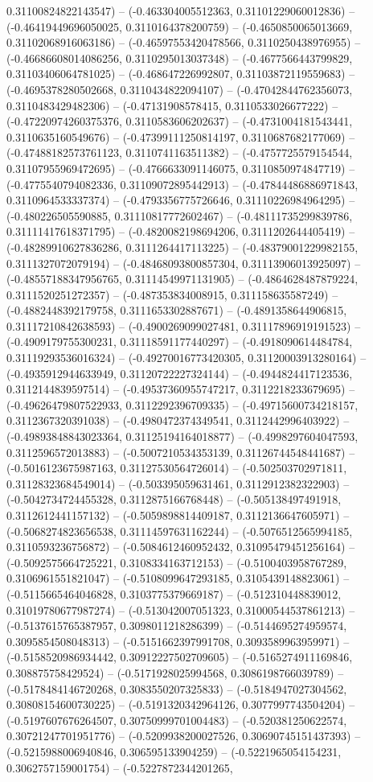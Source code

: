 0.31100824822143547) -- (-0.463304005512363, 0.31101229060012836) -- (-0.46419449696050025, 0.3110164378200759) -- (-0.4650850065013669, 0.31102068916063186) -- (-0.46597553420478566, 0.3110250438976955) -- (-0.46686608014086256, 0.3110295013037348) -- (-0.4677566443799829, 0.31103406064781025) -- (-0.468647226992807, 0.31103872119559683) -- (-0.4695378280502668, 0.3110434822094107) -- (-0.47042844762356073, 0.3110483429482306) -- (-0.47131908578415, 0.3110533026677222) -- (-0.47220974260375376, 0.3110583606202637) -- (-0.4731004181543441, 0.3110635160549676) -- (-0.47399111250814197, 0.3110687682177069) -- (-0.47488182573761123, 0.3110741163511382) -- (-0.4757725579154544, 0.31107955969472695) -- (-0.4766633091146075, 0.3110850974847719) -- (-0.4775540794082336, 0.31109072895442913) -- (-0.47844486886971843, 0.3110964533337374) -- (-0.4793356775726646, 0.31110226984964295) -- (-0.480226505590885, 0.31110817772602467) -- (-0.48111735299839786, 0.31111417618371795) -- (-0.4820082198694206, 0.3111202644405419) -- (-0.48289910627836286, 0.3111264417113225) -- (-0.48379001229982155, 0.3111327072079194) -- (-0.48468093800857304, 0.31113906013925097) -- (-0.48557188347956765, 0.31114549971131905) -- (-0.4864628487879224, 0.3111520251272357) -- (-0.487353834008915, 0.311158635587249) -- (-0.4882448392179758, 0.3111653302887671) -- (-0.4891358644906815, 0.31117210842638593) -- (-0.4900269099027481, 0.31117896919191523) -- (-0.4909179755300231, 0.31118591177440297) -- (-0.4918090614484784, 0.31119293536016324) -- (-0.49270016773420305, 0.31120003913280164) -- (-0.4935912944633949, 0.31120722227324144) -- (-0.4944824417123536, 0.3112144839597514) -- (-0.49537360955747217, 0.3112218233679695) -- (-0.49626479807522933, 0.3112292396709335) -- (-0.49715600734218157, 0.3112367320391038) -- (-0.4980472374349541, 0.3112442996403922) -- (-0.49893848843023364, 0.31125194164018877) -- (-0.4998297604047593, 0.3112596572013883) -- (-0.5007210534353139, 0.31126744548441687) -- (-0.5016123675987163, 0.31127530564726014) -- (-0.502503702971811, 0.31128323684549014) -- (-0.503395059631461, 0.3112912382322903) -- (-0.5042734724455328, 0.3112875166768448) -- (-0.505138497491918, 0.3112612441157132) -- (-0.5059898814409187, 0.3112136647605971) -- (-0.5068274823656538, 0.31114597631162244) -- (-0.5076512565994185, 0.3110593236756872) -- (-0.5084612460952432, 0.31095479451256164) -- (-0.5092575664725221, 0.3108334163712153) -- (-0.5100403958767289, 0.3106961551821047) -- (-0.5108099647293185, 0.3105439148823061) -- (-0.5115665464046828, 0.3103775379669187) -- (-0.512310448839012, 0.31019780677987274) -- (-0.513042007051323, 0.31000544537861213) -- (-0.5137615765387957, 0.3098011218286399) -- (-0.5144695274959574, 0.3095854508048313) -- (-0.5151662397991708, 0.3093589963959971) -- (-0.5158520986934442, 0.30912227502709605) -- (-0.5165274911169846, 0.308875758429524) -- (-0.5171928025994568, 0.3086198766039789) -- (-0.5178484146720268, 0.3083550207325833) -- (-0.5184947027304562, 0.30808154600730225) -- (-0.5191320342964126, 0.3077997743504204) -- (-0.5197607676264507, 0.30750999701004483) -- (-0.520381250622574, 0.30721247701951776) -- (-0.5209938200027526, 0.30690745151437393) -- (-0.5215988006940846, 0.306595133904259) -- (-0.5221965054154231, 0.3062757159001754) -- (-0.5227872344201265, 